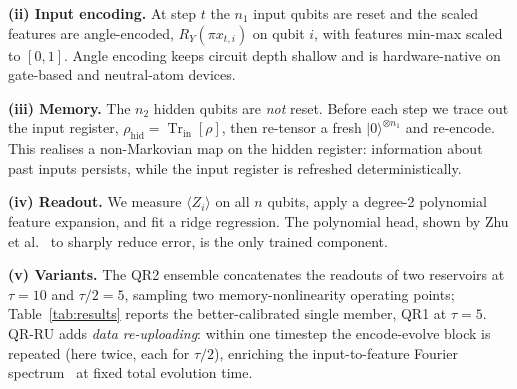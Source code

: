 \documentclass[11pt]{article}
\newcommand{\tr}{\operatorname{Tr}}
\begin{document}
\textbf{(ii) Input encoding.} At step $t$ the $n_1$ input qubits are reset and the scaled features are angle-encoded, $R_Y(\pi x_{t,i})$ on qubit $i$, with features min-max scaled to $[0,1]$. Angle encoding keeps circuit depth shallow and is hardware-native on gate-based and neutral-atom devices.

\textbf{(iii) Memory.} The $n_2$ hidden qubits are \emph{not} reset. Before each step we trace out the input register, $\rho_{\text{hid}}=\tr_{\text{in}}[\rho]$, then re-tensor a fresh $|0\rangle^{\otimes n_1}$ and re-encode. This realises a non-Markovian map on the hidden register: information about past inputs persists, while the input register is refreshed deterministically.

\textbf{(iv) Readout.} We measure $\langle Z_i\rangle$ on all $n$ qubits, apply a degree-2 polynomial feature expansion, and fit a ridge regression. The polynomial head, shown by Zhu et al.~\cite{zhu2025} to sharply reduce error, is the only trained component.

\textbf{(v) Variants.} The QR2 ensemble concatenates the readouts of two reservoirs at $\tau=10$ and $\tau/2=5$, sampling two memory-nonlinearity operating points; Table~\ref{tab:results} reports the better-calibrated single member, QR1 at $\tau=5$. QR-RU adds \emph{data re-uploading}: within one timestep the encode-evolve block is repeated (here twice, each for $\tau/2$), enriching the input-to-feature Fourier spectrum~\cite{schuld2021} at fixed total evolution time.
\end{document}

